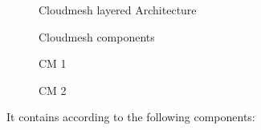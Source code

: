 \begin{figure}[htb]
  \centering
  \caption{Cloudmesh layered Architecture} 
  \label{F:NIST-arch}
\end{figure}

\begin{figure}[htb]
  \centering
  \caption{Cloudmesh components} 
  \label{F:NIST-arch}
\end{figure}

\begin{figure}[htb]
  \centering
  \caption{CM 1}
  \label{F:NIST-arch}
\end{figure}

\begin{figure}[htb]
  \centering
  \caption{CM 2}
  \label{F:NIST-arch}
\end{figure}



It contains according to \cite{nist-bd} the following components:

